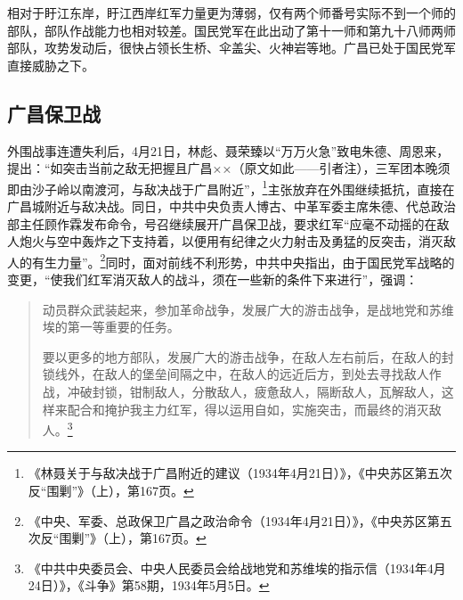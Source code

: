 相对于盱江东岸，盱江西岸红军力量更为薄弱，仅有两个师番号实际不到一个师的部队，部队作战能力也相对较差。国民党军在此出动了第十一师和第九十八师两师部队，攻势发动后，很快占领长生桥、伞盖尖、火神岩等地。广昌已处于国民党军直接威胁之下。

\subsection{广昌保卫战}


外围战事连遭失利后，4月21日，林彪、聂荣臻以“万万火急”致电朱德、周恩来，提出：“如突击当前之敌无把握且广昌××（原文如此——引者注），三军团本晚须即由沙子岭以南渡河，与敌决战于广昌附近”，\footnote{《林聂关于与敌决战于广昌附近的建议（1934年4月21日）》，《中央苏区第五次反“围剿”》（上），第167页。}主张放弃在外围继续抵抗，直接在广昌城附近与敌决战。同日，中共中央负责人博古、中革军委主席朱德、代总政治部主任顾作霖发布命令，号召继续展开广昌保卫战，要求红军“应毫不动摇的在敌人炮火与空中轰炸之下支持着，以便用有纪律之火力射击及勇猛的反突击，消灭敌人的有生力量”。\footnote{《中央、军委、总政保卫广昌之政治命令（1934年4月21日）》，《中央苏区第五次反“围剿”》（上），第167页。}同时，面对前线不利形势，中共中央指出，由于国民党军战略的变更，“使我们红军消灭敌人的战斗，须在一些新的条件下来进行”，强调：

\begin{quote}

动员群众武装起来，参加革命战争，发展广大的游击战争，是战地党和苏维埃的第一等重要的任务。

要以更多的地方部队，发展广大的游击战争，在敌人左右前后，在敌人的封锁线外，在敌人的堡垒间隔之中，在敌人的远近后方，到处去寻找敌人作战，冲破封锁，钳制敌人，分散敌人，疲惫敌人，隔断敌人，瓦解敌人，这样来配合和掩护我主力红军，得以运用自如，实施突击，而最终的消灭敌人。\footnote{《中共中央委员会、中央人民委员会给战地党和苏维埃的指示信（1934年4月24日）》，《斗争》第58期，1934年5月5日。}
\end{quote}


